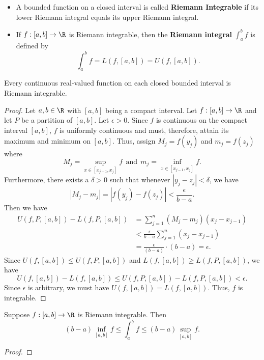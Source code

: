 \begin{definition}
    \begin{itemize}
        \item A bounded function on a closed interval is called \textbf{Riemann Integrable} if its lower Riemann integral equals its upper Riemann integral.
        \item If \( f: [a,b] \to \R  \) is Riemann integrable, then the \textbf{Riemann integral} \( \int_{ a }^{ b }  f  \) is defined by
            \[ \int_{ a }^{ b }  f = L(f,[a,b]) = U(f,[a,b]). \]
    \end{itemize}
\end{definition}

\begin{prop}
    Every continuous real-valued function on each closed bounded interval is Riemann integrable.
\end{prop}

\begin{proof}
    Let \( a,b \in \R  \) with \( [a,b] \) being a compact interval. Let \( f: [a,b]  \to \R   \) and let \( P  \) be a partition of \( [a,b] \). Let \( \epsilon > 0  \). Since \( f \) is continuous on the compact interval \( [a,b] \), \( f \) is uniformly continuous and must, therefore, attain its maximum and minimum on \( [a,b] \). Thus, assign \( {M}_{j} = f({y}_{j})     \) and \( {m}_{j} = f({z}_{j}) \) where 
    \[  {M}_{j} = \sup_{x \in [{x}_{j-1}, {x}_{j} ]} f \ \ \text{and} \ \ {m}_{j} = \inf_{x \in [{x}_{j-1}, {x}_{j}]} f.  \]
    Furthermore, there exists a \( \delta > 0   \) such that whenever \( | {y}_{j}   - {z}_{j} | < \delta  \), we have
    \[  | {M}_{j} - {m}_{j} | = | f({y}_{j}) - f({z}_{j}) | < \frac{ \epsilon }{ b - a  }. \]
    Then we have
    \begin{align*}
        U(f,P,[a,b]) - L(f, P, [a,b]) &= \sum_{ j=1  }^{ n } ({M}_{j} - {m}_{j}) ({x}_{j} - {x}_{j-1})  \\
                                      &< \frac{ \epsilon }{ b-a  }  \sum_{ j=1  }^{ n } ({x}_{j} - {x}_{j-1}) \\
                                      &= \frac{ \epsilon }{ (b - a)  }  \cdot (b-a) = \epsilon.
    \end{align*}
    Since \( U(f,[a,b]) \leq U(f,P,[a,b]) \) and \( L(f,[a,b])  \geq L(f,P,[a,b])\), we have
    \[  U(f,[a,b]) - L(f,[a,b]) \leq U(f, P, [a,b]) - L(f, P, [a,b]) < \epsilon. \]
    Since \( \epsilon \) is arbitrary, we must have \( U(f,[a,b]) = L(f,[a,b]) \). Thus, \( f  \) is integrable.
\end{proof}

\begin{prop}
    Suppose \( f: [a,b] \to \R  \) is Riemann integrable. Then 
    \[  (b-a) \inf_{[a,b]} f \leq \int_{ a }^{ b }  f \leq (b-a) \sup_{[a,b]} f. \]

\end{prop}
\begin{proof}

\end{proof}

